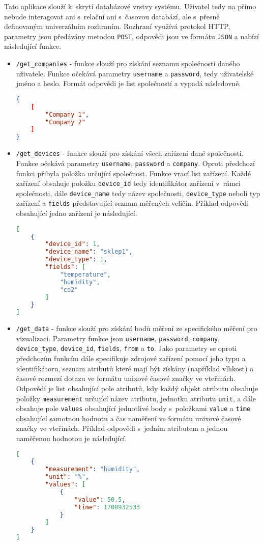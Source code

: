 Tato aplikace slouží k~skrytí databázové vrstvy systému. Uživatel tedy na přímo nebude interagovat ani s~relační ani s~časovou databází, ale s~přesně definovaným univerzálním rozhraním. Rozhraní využívá protokol HTTP, parametry jsou předávány metodou \texttt{POST}, odpovědi jsou ve formátu \texttt{JSON} a nabízí následující funkce.
\begin{itemize}
    \item \texttt{/get\_companies} - funkce slouží pro získání seznamu společností daného uživatele. Funkce očekává parametry \texttt{username} a \texttt{password}, tedy uživatelské jméno a heslo. Formát odpovědi je list společností a vypadá následovně.
    \begin{lstlisting}[language=json]
{
    [
        "Company 1",
        "Company 2"
    ]
}
    \end{lstlisting}
    \item \texttt{/get\_devices} - funkce slouží pro získání všech zařízení dané společnosti. Funkce očekává parametry \texttt{username}, \texttt{password} a \texttt{company}. Oproti předchozí funkci přibyla položka určující společnost. Funkce vrací list zařízení. Každé zařízení obsahuje položku \texttt{device\_id} tedy identifikátor zařízení v~rámci společnosti, dále \texttt{device\_name} tedy název společnosti, \texttt{device\_type} neboli typ zařízení a \texttt{fields} představující seznam měřených veličin. Příklad odpovědi obsahující jedno zařízení je následující.
    \begin{lstlisting}[language=json]
[
    {
        "device_id": 1,
        "device_name": "sklep1",
        "device_type": 1,
        "fields": [
            "temperature",
            "humidity",
            "co2"
        ]
    }
]
    \end{lstlisting}
    \item \texttt{/get\_data} - funkce slouží pro získání bodů měření ze specifického měření pro vizualizaci. Parametry funkce jsou \texttt{username}, \texttt{password}, \texttt{company}, \texttt{device\_type}, \texttt{device\_id}, \texttt{fields}, \texttt{from} a \texttt{to}. Jako parametry se oproti předchozím funkcím dále specifikuje zdrojové zařízení pomocí jeho typu a identifikátoru, seznam atributů které mají být získány (například vlhkost) a časové rozmezí dotazu ve formátu unixové časové značky ve vteřinách. Odpovědí je list obsahující pole atributů, kdy každý objekt atributu obsahuje položky \texttt{measurement} určující název atributu, jednotku atributu \texttt{unit}, a dále obsahuje pole \texttt{values} obsahující jednotlivé body s~položkami \texttt{value} a \texttt{time} obsahující samotnou hodnotu a čas naměření ve formátu unixové časové značky ve vteřinách. Příklad odpovědi s~jedním atributem a jednou naměřenou hodnotou je následující.
    \begin{lstlisting}[language=json]
[
    {
        "measurement": "humidity",
        "unit": "%",
        "values": [
            {
                "value": 50.5,
                "time": 1708932533
            }
        ]
    }
]
    \end{lstlisting}
\end{itemize}
